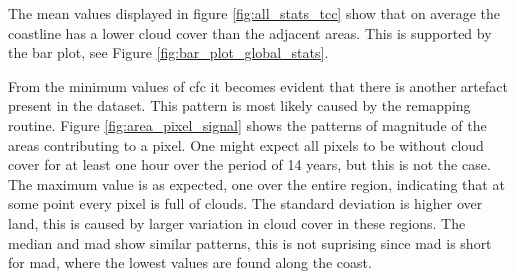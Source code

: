 The mean values displayed in figure \ref{fig:all_stats_tcc} show that on average the coastline has a lower cloud cover than the adjacent areas. This is supported by the bar plot, see Figure \ref{fig:bar_plot_global_stats}. 

From the minimum values of \acrshort{cfc} it becomes evident that there is another artefact present in the dataset. This pattern is most likely caused by the remapping routine. Figure \ref{fig:area_pixel_signal} shows the patterns of magnitude of the areas contributing to a pixel. One might expect all pixels to be without cloud cover for at least one hour over the period of 14 years, but this is not the case. The maximum value is as expected, one over the entire region, indicating that at some point every pixel is full of clouds. The standard deviation is higher over land, this is caused by larger variation in cloud cover in these regions. The median and \acrshort{mad} 
show similar patterns, this is not suprising since \acrshort{mad} is short for \acrlong{mad}, where the lowest values are found along the coast.

